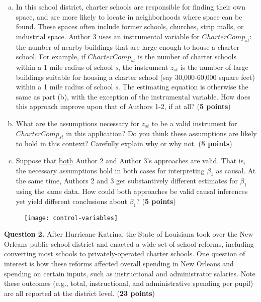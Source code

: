 \documentclass[12pt]{article}
\begin{document}
\begin{enumerate}[(a)]
\item In this school district, charter schools are responsible for finding their own space, and are more likely to locate in neighborhoods where space can be found. These spaces often include former schools, churches, strip malls, or industrial space. Author 3 uses an instrumental variable for $CharterComp_{st}$: the number of nearby buildings that are large enough to house a charter school. For example, if $CharterComp_{st}$ is the number of charter schools within a 1 mile radius of school \textit{s}, the instrument $z_{st}$ is the number of large buildings suitable for housing a charter school (say 30,000-60,000 square feet) within a 1 mile radius of school \textit{s}. The estimating equation is otherwise the same as part (b), with the exception of the instrumental variable. How does this approach improve upon that of Authors 1-2, if at all? ({\bf 5 points})
\medskip

\item What are the assumptions necessary for $z_{st}$ to be a valid instrument for $CharterComp_{st}$ in this application? Do you think these assumptions are likely to hold in this context? Carefully explain why or why not. ({\bf 5 points})
\medskip

\item Suppose that \underline{both} Author 2 and Author 3's approaches are valid. That is, the necessary assumptions hold in both cases for interpreting $\beta_1$ as causal. At the same time, Authors 2 and 3 get substantively different estimates for $\beta_1$ using the same data. How could both approaches be valid causal inferences yet yield different conclusions about $\beta_1$? ({\bf 5 points})
\end{enumerate}

\bigskip
\begin{figure}[h!]
\begin{center}
\texttt{[image: control-variables]} 
\end{center}
\end{figure}

\pagebreak


\textbf{Question 2.} After Hurricane Katrina, the State of Louisiana took over the New Orleans public school district and enacted a wide set of school reforms, including converting most schools to privately-operated charter schools. One question of interest is how these reforms affected overall spending in New Orleans and spending on certain inputs, such as instructional and administrator salaries. Note these outcomes (e.g., total, instructional, and administrative spending per pupil) are all reported at the district level. ({\bf 23 points})
\bigskip
\end{document}
